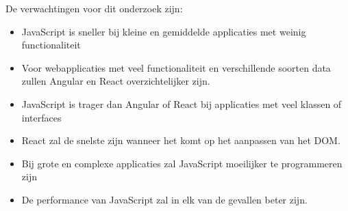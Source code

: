 De verwachtingen voor dit onderzoek zijn:
\begin{itemize}
	\item JavaScript is sneller bij kleine en gemiddelde applicaties met weinig functionaliteit
	\item Voor webapplicaties met veel functionaliteit en verschillende soorten data zullen Angular en React overzichtelijker zijn.
	\item JavaScript is trager dan Angular of React bij applicaties met veel klassen of interfaces
    \item React zal de snelste zijn wanneer het komt op het aanpassen van het DOM.
	\item Bij grote en complexe applicaties zal JavaScript moeilijker te programmeren zijn
    \item De performance van JavaScript zal in elk van de gevallen beter zijn.
\end{itemize}

